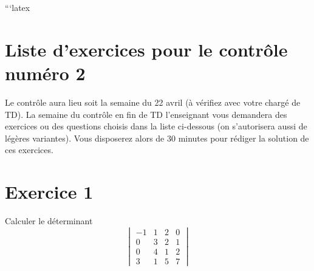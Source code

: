```latex

\sloppy

\section*{Liste d’exercices pour le contrôle numéro 2}

Le contrôle aura lieu soit la semaine du 22 avril (à vérifiez avec votre chargé de TD).
La semaine du contrôle en fin de TD l’enseignant vous demandera des exercices ou des
questions choisis dans la liste ci-dessous (on s’autorisera aussi de légères variantes).
Vous disposerez alors de 30 minutes pour rédiger la solution de ces exercices.

\section{Exercice 1}
Calculer le déterminant
\[
\begin{vmatrix}
-1 & 1 & 2 & 0 \\
0 & 3 & 2 & 1 \\
0 & 4 & 1 & 2 \\
3 & 1 & 5 & 7
\end{vmatrix}
\]


